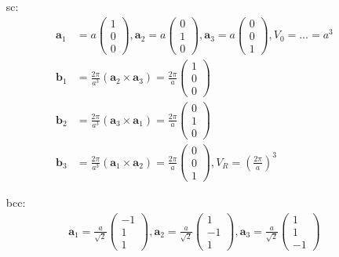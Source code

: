 \begin{itemize}
          \begin{itemize}
              \item[sc:]
                    \begin{align*}
                        \textbf{a}_1 & = a \left(\begin{array}{c} 1 \\ 0 \\ 0 \end{array}\right) , \textbf{a}_2 = a \left(\begin{array}{c} 0 \\ 1 \\ 0 \end{array}\right) , \textbf{a}_3 = a \left(\begin{array}{c} 0 \\ 0 \\ 1 \end{array}\right) , V_0 = \dots = a^3 \\
                        \textbf{b}_1 & = \frac{2 \pi}{a^3} (\textbf{a}_2 \times \textbf{a}_3) = \frac{2 \pi }{a} \left(\begin{array}{c} 1 \\ 0 \\ 0 \end{array}\right)                                                                     \\
                        \textbf{b}_2 & = \frac{2 \pi}{a^3} (\textbf{a}_3 \times \textbf{a}_1) = \frac{2 \pi }{a} \left(\begin{array}{c} 0 \\ 1 \\ 0 \end{array}\right)                                                                     \\
                        \textbf{b}_3 & = \frac{2 \pi}{a^3} (\textbf{a}_1 \times \textbf{a}_2) = \frac{2 \pi }{a} \left(\begin{array}{c} 0 \\ 0 \\ 1 \end{array}\right), V_R = (\frac{2 \pi}{a})^3
                    \end{align*}
              \item[bcc:]
                    \begin{align*}
                        \textbf{a}_1 = \frac{a}{\sqrt{2}} \left(\begin{array}{c} -1 \\ 1 \\ 1 \end{array}\right), \textbf{a}_2 = \frac{a}{\sqrt{2}} \left(\begin{array}{c} 1 \\ -1 \\ 1 \end{array}\right), \textbf{a}_3 = \frac{a}{\sqrt{2}} \left(\begin{array}{c} 1 \\ 1 \\ -1 \end{array}\right)

\end{align*}
\end{itemize}
\end{itemize}
